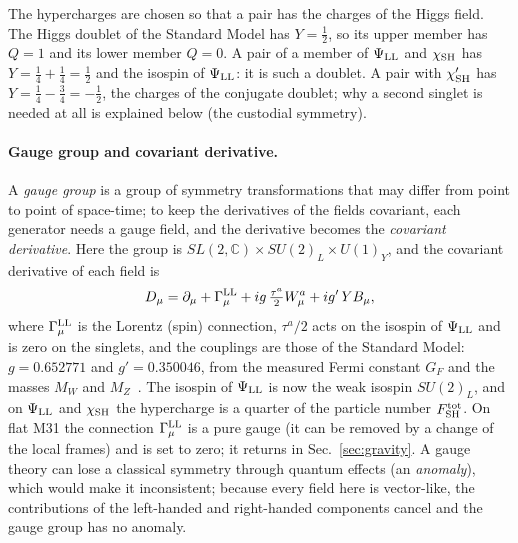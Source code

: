 \documentclass[aps,prd,twocolumn,superscriptaddress,nofootinbib,floatfix,longbibliography]{revtex4-2}
\newcommand{\LL}{{\rm LL}}
\newcommand{\SH}{{\rm SH}}
\begin{document}
The hypercharges are chosen so that a pair has the charges of the Higgs field. The Higgs doublet of the Standard Model
has $Y=\frac12$, so its upper member has $Q=1$ and its lower member $Q=0$. A pair of a member of $\Psi_\LL$ and $\chi_\SH$
has $Y=\frac14+\frac14=\frac12$ and the isospin of $\Psi_\LL$: it is such a doublet. A pair with $\chi'_\SH$ has
$Y=\frac14-\frac34=-\frac12$, the charges of the conjugate doublet; why a second singlet is needed at all is explained
below (the custodial symmetry).

\paragraph*{Gauge group and covariant derivative.}
A \emph{gauge group} is a group of symmetry transformations that may differ from point to point of space-time; to keep
the derivatives of the fields covariant, each generator needs a gauge field, and the derivative becomes the
\emph{covariant derivative}. Here the group is $SL(2,\mathbb C)\times SU(2)_L\times U(1)_Y$, and the covariant
derivative of each field is
\begin{equation}
D_\mu=\partial_\mu+\Gamma^\LL_\mu+ig\,\tfrac{\tau^a}{2}W^a_\mu+ig'\,Y B_\mu ,
\label{eq:cov}
\end{equation}
where $\Gamma^\LL_\mu$ is the Lorentz (spin) connection, $\tau^a/2$ acts on the isospin of $\Psi_\LL$ and is zero on the
singlets, and the couplings are those of the Standard Model: $g=0.652771$ and $g'=0.350046$, from the measured Fermi constant
$G_F$ and the masses $M_W$ and $M_Z$~\cite{PDG2026}. The isospin of $\Psi_\LL$ is now the weak isospin $SU(2)_L$, and on
$\Psi_\LL$ and $\chi_\SH$ the hypercharge is a quarter of the particle number $F^{\rm tot}_\SH$. On flat M31 the
connection $\Gamma^\LL_\mu$ is a pure gauge (it can be removed by a change of the local frames) and is set to zero; it
returns in Sec.~\ref{sec:gravity}. A gauge theory can lose a classical symmetry through quantum effects (an
\emph{anomaly}), which would make it inconsistent; because every field here is vector-like, the contributions of the
left-handed and right-handed components cancel and the gauge group has no anomaly.
\end{document}
